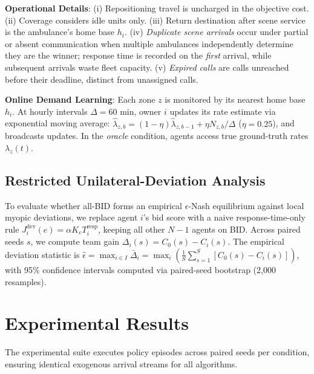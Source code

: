 \documentclass{article}
\begin{document}
\noindent\textbf{Operational Details}: (i) Repositioning travel is uncharged in the objective cost. (ii) Coverage considers idle units only. (iii) Return destination after scene service is the ambulance's home base $h_i$. (iv) \textit{Duplicate scene arrivals} occur under partial or absent communication when multiple ambulances independently determine they are the winner; response time is recorded on the \textit{first} arrival, while subsequent arrivals waste fleet capacity. (v) \textit{Expired calls} are calls unreached before their deadline, distinct from unassigned calls.

\noindent\textbf{Online Demand Learning}: Each zone $z$ is monitored by its nearest home base $h_i$. At hourly intervals $\Delta = 60$ min, owner $i$ updates its rate estimate via exponential moving average: $\widehat{\lambda}_{z, b} = (1 - \eta)\widehat{\lambda}_{z, b-1} + \eta N_{z, b}/\Delta$ ($\eta = 0.25$), and broadcasts updates. In the \textit{oracle} condition, agents access true ground-truth rates $\lambda_z(t)$.

\subsection{Restricted Unilateral-Deviation Analysis}
To evaluate whether all-BID forms an empirical $\epsilon$-Nash equilibrium against local myopic deviations, we replace agent $i$'s bid score with a naive response-time-only rule $J_i^{\mathrm{dev}}(e) = \alpha K_e T_i^{\mathrm{resp}}$, keeping all other $N-1$ agents on BID. Across paired seeds $s$, we compute team gain $\Delta_i(s) = C_0(s) - C_i(s)$. The empirical deviation statistic is $\widehat{\epsilon} = \max_{i \in I} \bar{\Delta}_i = \max_{i} \left( \frac{1}{S} \sum_{s=1}^S [C_0(s) - C_i(s)] \right)$, with 95\% confidence intervals computed via paired-seed bootstrap (2,000 resamples).

\section{Experimental Results}
The experimental suite executes \NPolicyRuns{} policy episodes across \NScenarioSeeds{} paired seeds per condition, ensuring identical exogenous arrival streams for all algorithms.
\end{document}
